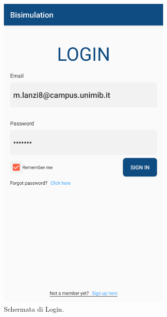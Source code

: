 \documentclass[a4paper,11pt,twoside,openright]{report}
\begin{document}
\begin{figure}[h]
\centering
\begin{subfigure}{.5\textwidth}
  \centering
  \includegraphics[width=.4\linewidth,height=460pt,keepaspectratio]{images/Login.png}
  \caption{Schermata di Login.}
\end{subfigure}%
\begin{subfigure}{.5\textwidth}
  \centering

\end{subfigure}
\end{figure}
\end{document}
